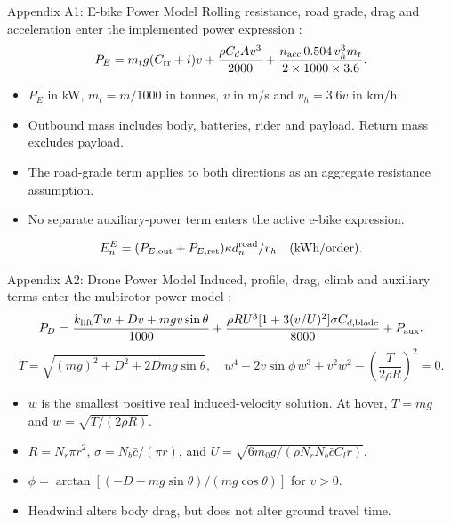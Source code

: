 \documentclass[9pt]{beamer}
\begin{document}
\begin{frame}{Appendix A1: E-bike Power Model}
\label{app:emission:1}
\small
Rolling resistance, road grade, drag and acceleration enter the implemented power expression \parencite{kirschstein_comparison_2020}:
\[
P_E=m_tg(C_{\rm rr}+i)v+\frac{\rho C_dAv^3}{2000}
+\frac{n_{\rm acc}\,0.504\,v_h^3m_t}{2\times1000\times3.6}.
\]
\begin{itemize}
\item $P_E$ in kW, $m_t=m/1000$ in tonnes, $v$ in m/s and $v_h=3.6v$ in km/h.
\item Outbound mass includes body, batteries, rider and payload. Return mass excludes payload.
\item The road-grade term applies to both directions as an aggregate resistance assumption.
\item No separate auxiliary-power term enters the active e-bike expression.
\end{itemize}
\[
E^E_n=(P_{E,\rm out}+P_{E,\rm ret})\kappa d_n^{\rm road}/v_h\quad\text{(kWh/order)}.
\]

\end{frame}

\begin{frame}{Appendix A2: Drone Power Model}
\label{app:emission:2}
\small
Induced, profile, drag, climb and auxiliary terms enter the multirotor power model \parencite{kirschstein_comparison_2020,stolaroff_energy_2018}:
\[
P_D=\frac{k_{\rm lift}Tw+Dv+mgv\sin\theta}{1000}
+\frac{\rho R U^3[1+3(v/U)^2]\sigma C_{d,\rm blade}}{8000}+P_{\rm aux}.
\]
\[
T=\sqrt{(mg)^2+D^2+2Dmg\sin\theta},\quad
w^4-2v\sin\phi\,w^3+v^2w^2-\left(\frac{T}{2\rho R}\right)^2=0.
\]
\begin{itemize}
\item $w$ is the smallest positive real induced-velocity solution. At hover, $T=mg$ and $w=\sqrt{T/(2\rho R)}$.
\item $R=N_r\pi r^2$, $\sigma=N_b\bar c/(\pi r)$, and $U=\sqrt{6m_0g/(\rho N_rN_b\bar c C_l r)}$.
\item $\phi=\arctan[(-D-mg\sin\theta)/(mg\cos\theta)]$ for $v>0$.
\item Headwind alters body drag, but does not alter ground travel time.
\end{itemize}

\end{frame}
\end{document}
